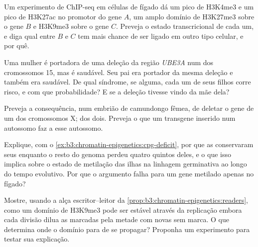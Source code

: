 \begin{exercise}[$\star\star$]\label{exo:b3:chromatin-epigenetics:7}
Um experimento de ChIP-seq em células de fígado dá um pico de H3K4me3
e um pico de H3K27ac no promotor do gene $A$, um amplo domínio de
H3K27me3 sobre o gene $B$ e H3K9me3 sobre o gene $C$. Preveja o estado
transcricional de cada um, e diga qual entre $B$ e $C$ tem mais chance
de ser ligado em outro tipo celular, e por quê.
\end{exercise}

\begin{exercise}[$\star\star$]\label{exo:b3:chromatin-epigenetics:8}
Uma mulher é portadora de uma deleção da região \emph{UBE3A} num dos
cromossomos 15, mas é saudável. Seu pai era portador da mesma deleção
e também era saudável. De qual síndrome, se alguma, cada um de seus
filhos corre risco, e com que probabilidade? E se a deleção tivesse
vindo da mãe dela?
\end{exercise}

\begin{exercise}[$\star\star$]\label{exo:b3:chromatin-epigenetics:9}
Preveja a consequência, num embrião de camundongo fêmea, de deletar o
gene \emph{} de um dos cromossomos X; dos dois. Preveja o que um
transgene \emph{} inserido num autossomo faz a esse autossomo.
\end{exercise}

\begin{exercise}[$\star\star\star$]\label{exo:b3:chromatin-epigenetics:10}
Explique, com o \cref{ex:b3:chromatin-epigenetics:cpg-deficit}, por
que as  conservaram seus  enquanto o resto do genoma
perdeu quatro quintos deles, e o que isso implica sobre o estado de
metilação das ilhas na linhagem germinativa ao longo do tempo
evolutivo. Por que o argumento falha para um gene metilado apenas no
fígado?
\end{exercise}

\begin{exercise}[$\star\star\star$]\label{exo:b3:chromatin-epigenetics:11}
Mostre, usando a alça escritor--leitor da
\cref{prop:b3:chromatin-epigenetics:readers}, como um domínio de
H3K9me3 pode ser estável através da replicação embora cada divisão
dilua as  marcadas pela metade com  novas sem marca. O
que determina onde o domínio para de se propagar? Proponha um
experimento para testar sua explicação.
\end{exercise}

